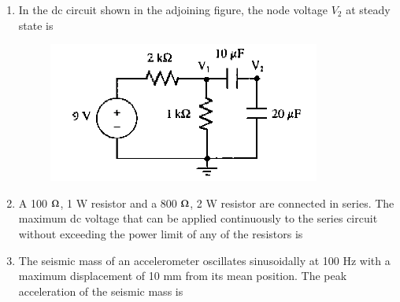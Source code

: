 \documentclass[journal,12pt,onecolumn]{IEEEtran}
\theoremstyle{remark}
\begin{document}
\begin{enumerate}
\item In the dc circuit shown in the adjoining figure, the node voltage $V_2$ at steady state is
\begin{figure}[H]
    \centering
    \includegraphics[width = 0.7\columnwidth]{q15}
    \caption*{}
    \label{Q15}
\end{figure}

\hfill{}
\begin{enumerate}
\end{enumerate}

\item A 100 $\ohm$, 1 W resistor and a 800 $\ohm$, 2 W resistor are connected in series. The maximum dc voltage that can be applied continuously to the series circuit without exceeding the power limit of any of the resistors is

\hfill{}
\begin{enumerate}
\end{enumerate}

\item The seismic mass of an accelerometer oscillates sinusoidally at 100 Hz with a maximum displacement of 10 mm from its mean position. The peak acceleration of the seismic mass is

\hfill{}
\begin{enumerate}
\end{enumerate}


\end{enumerate}
\end{document}
